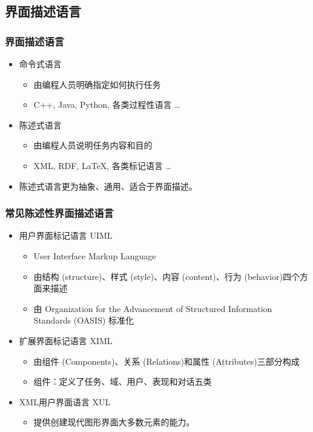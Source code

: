 \documentclass{beamer}
\begin{document}
\subsection{界面描述语言}
\begin{frame}
	\frametitle{界面描述语言}
	\beamertemplatetransparentcovereddynamicmedium
	\begin{itemize}
		\item 命令式语言
		\begin{itemize}
			\item 由编程人员明确指定如何执行任务
			\item C++, Java, Python, 各类过程性语言 \dots
		\end{itemize}
		\pause
		\item 陈述式语言
		\begin{itemize}
			\item 由编程人员说明任务内容和目的
			\item XML, RDF, LaTeX, 各类标记语言 \dots
		\end{itemize}
		\pause
		\item 陈述式语言更为抽象、通用、适合于界面描述。
	\end{itemize}
\end{frame}

\begin{frame}
	\frametitle{常见陈述性界面描述语言}
	\beamertemplatetransparentcovereddynamicmedium
	\begin{itemize}
		\item 用户界面标记语言 UIML
		\begin{itemize}
			\item User Interface Markup Language
			\item 由结构 (structure)、样式 (style)、内容 (content)、行为 (behavior)四个方面来描述~\cite{abrams1999uiml}
			\item 由 Organization for the Advancement of Structured Information Standards (OASIS) 标准化
		\end{itemize}
		\pause
		\item 扩展界面标记语言 XIML
		\begin{itemize}
			\item 由组件 (Components)、关系 (Relations)和属性 (Attributes)三部分构成
			\item 组件：定义了任务、域、用户、表现和对话五类
		\end{itemize}
		\pause
		\item XML用户界面语言 XUL
		\begin{itemize}
			\item 提供创建现代图形界面大多数元素的能力。
		\end{itemize}
	\end{itemize}
\end{frame}
\end{document}
